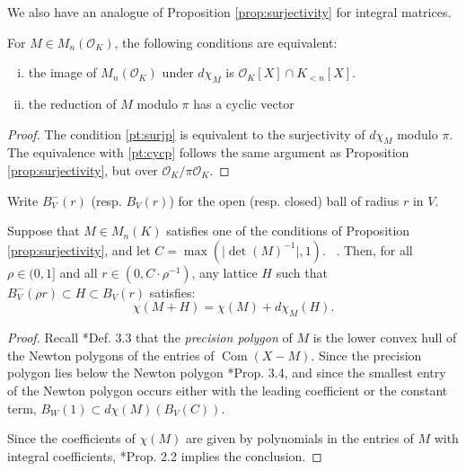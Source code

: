 \documentclass{sig-alternate-05-2015}
\DeclareMathOperator{\com}{Com}
\newcommand{\OK}{\mathcal{O}_K}
\def\todo#1{\ \!\!{\color{red} #1}}
\begin{document}
We also have an analogue of Proposition \ref{prop:surjectivity} for integral matrices.

\begin{prop}
\label{prop:intsurj}
For $M \in M_n(\OK)$, the following conditions are equivalent:
\begin{enumerate}[(i)]
\renewcommand{\itemsep}{0pt}
\item \label{pt:surjp} the image of $M_n(\OK)$ under $d\chi_M$ is $\OK[X] \cap K_{<n}[X]$.
\item \label{pt:cycp} the reduction of $M$ modulo $\pi$ has a cyclic vector
\end{enumerate}
\end{prop}
\begin{proof}
The condition \eqref{pt:surjp} is equivalent to the surjectivity of $d\chi_M$ modulo $\pi$.  The equivalence with
\eqref{pt:cycp} follows the same argument as Proposition \ref{prop:surjectivity}, but over $\OK / \pi\OK$.
\end{proof}

Write $B^-_V(r)$ (resp. $B_V(r)$) for the open (resp. closed) ball of radius $r$ in $V$.

\begin{prop} \label{prop:mainlem}
Suppose that $M \in M_n(K)$ satisfies one of the conditions of Proposition \ref{prop:surjectivity}, and
let $C = \max(\lvert \det(M)^{-1} \rvert, 1)$.  \todo{What if $\det(M) = 0$?}. Then, for all $\rho \in (0, 1]$ and all
$r \in (0, C \cdot \rho^{-1})$, any lattice $H$ such that $B_V^-(\rho r) \subset H \subset B_V(r)$
satisfies:
\begin{equation}
\chi(M + H) = \chi(M) + d\chi_M(H).
\end{equation}
\end{prop}

\begin{proof}

Recall \cite{caruso-roe-vaccon:15a}*{Def. 3.3} that the \emph{precision polygon}
of $M$ is the lower convex hull of the Newton polygons of the entries of $\com(X-M)$.
Since the precision polygon lies below the Newton polygon \cite{caruso-roe-vaccon:15a}*{Prop. 3.4},
and since the smallest entry of the Newton polygon occurs either with the leading
coefficient or the constant term, $B_W(1) \subset d\chi(M)(B_V(C))$.

Since the coefficients of $\chi(M)$ are given by polynomials in the entries of $M$
with integral coefficients, \cite{caruso-roe-vaccon:15a}*{Prop. 2.2} implies
the conclusion.
\end{proof}
\end{document}
